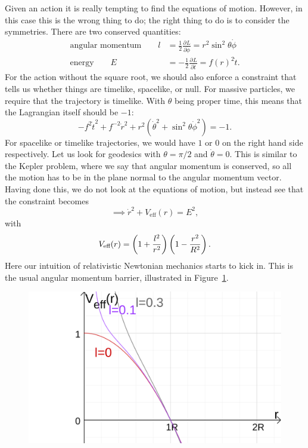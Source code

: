 Given an action it is really tempting to find the equations of motion. However, in this case this is the wrong thing to do; the right thing to do is to consider the symmetries.
There are two conserved quantities: 
\begin{align}
  \text{angular momentum} \qquad l &= \frac{1}{2} \frac{\partial^{} L}{\partial \dot \phi} = r^2 \sin^2\theta \dot \phi \\
  \text{energy} \qquad E &= -\frac{1}{2} \frac{\partial^{} L}{\partial \dot t} = f(r)^2 \dot t.
\end{align}
For the action without the square root, we should also enforce a constraint that tells us whether things are timelike, spacelike, or null.
For massive particles, we require that the trajectory is timelike. With $\theta$ being proper time, this means that the Lagrangian itself should be $-1$:
\begin{equation}
  -f^2 \dot t^2 + f^{-2} \dot r^2 + r^2 (\dot \theta^2 + \sin^2\theta \dot \phi^2) = -1.
\end{equation}
For spacelike or timelike trajectories, we would have $1$ or $0$ on the right hand side respectively.
Let us look for geodesics with $\theta = \pi/2$ and $\dot \theta = 0$. This is similar to the Kepler problem, where we say that angular momentum is conserved, so all the motion has to be in the plane normal to the angular momentum vector.
Having done this, we do not look at the equations of motion, but instead see that the constraint becomes
\begin{equation}
  \implies \dot r^2 + V_{\text{eff}} (r) = E^2,
\end{equation}
with
\begin{equation}
  V_{\text{eff}}(r) = \qty(1 + \frac{l^2}{r^2}) \left( 1 - \frac{r^2}{R^2} \right).
\end{equation}
Here our intuition of relativistic Newtonian mechanics starts to kick in.
This is the usual angular momentum barrier, illustrated in Figure~\ref{fig:angmombar}.
\begin{figure}[tbph]
  \centering
  \includegraphics[width=0.6\columnwidth]{angmombar}
  \caption{}
  \label{fig:angmombar}
\end{figure}
